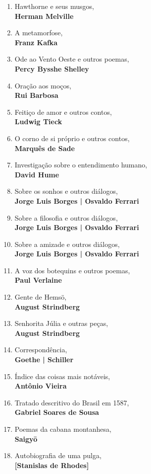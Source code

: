 \begin{enumerate} [font=\Formular\footnotesize]
\item Hawthorne e seus musgos,\\ \textbf{Herman Melville}
\item A metamorfose,\\ \textbf{Franz Kafka}
\item Ode ao Vento Oeste e outros poemas,\\ \textbf{Percy Bysshe Shelley}
\item Oração aos moços,\\ \textbf{Rui Barbosa}
\item Feitiço de amor e outros contos,\\ \textbf{Ludwig Tieck}
\item O corno de si próprio e outros contos,\\ \textbf{Marquês de Sade}
\item Investigação sobre o entendimento humano,\\ \textbf{David Hume}
\item Sobre os sonhos e outros diálogos,\\ \textbf{Jorge Luis Borges | Osvaldo Ferrari}
\item Sobre a filosofia e outros diálogos,\\ \textbf{Jorge Luis Borges | Osvaldo Ferrari}
\item Sobre a amizade e outros diálogos,\\ \textbf{Jorge Luis Borges | Osvaldo Ferrari}
\item A voz dos botequins e outros poemas,\\ \textbf{Paul Verlaine}
\item Gente de Hemsö,\\ \textbf{August Strindberg}
\item Senhorita Júlia e outras peças,\\ \textbf{August Strindberg}
\item Correspondência,\\ \textbf{Goethe | Schiller}
\item Índice das coisas mais notáveis,\\ \textbf{Antônio Vieira}
\item Tratado descritivo do Brasil em 1587,\\ \textbf{Gabriel Soares de Sousa}
\item Poemas da cabana montanhesa,\\ \textbf{Saigy\=o}
\item Autobiografia de uma pulga,\\ \textbf{{[}Stanislas de Rhodes{]}}

\end{enumerate}
